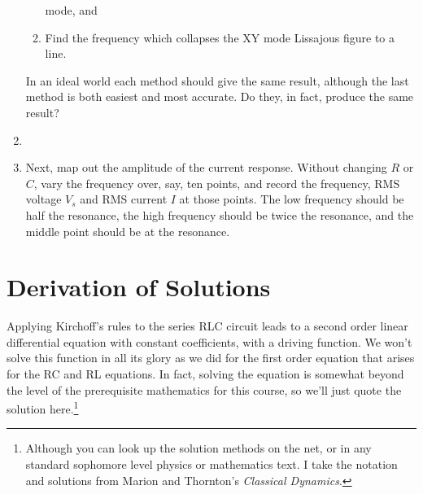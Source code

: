 \documentclass[12pt]{article}
\begin{document}
\begin{enumerate}
\begin{enumerate}
    mode, and
  \item Find the frequency which collapses the XY mode Lissajous
    figure to a line.
  \end{enumerate}
  In an ideal world each method should give the same result, although
  the last method is both easiest and most accurate.  Do they, in
  fact, produce the same result?
\item \label{item:amplitude_resonance} 
\item \label{item:current_response} Next, map out the amplitude of the current
  response.  Without changing $R$ or $C$, vary the frequency over, say, ten
  points, and record the frequency, RMS voltage $V_s$ and RMS current
  $I$ at those points.  The low frequency should be half the
  resonance, the high frequency should be twice the resonance, and the
  middle point should be at the resonance.
\end{enumerate}

\appendix

\section{Derivation of Solutions}
\label{sec:solutions}

Applying Kirchoff's rules to the series RLC circuit leads to a second
order linear differential equation with constant coefficients, with a
driving function.  We won't solve this function in all its glory as we
did for the first order equation that arises for the RC and RL
equations.  In fact, solving the equation is somewhat beyond the level
of the prerequisite mathematics for this course, so we'll just quote
the solution here.\footnote{Although you can look up the solution
  methods on the net, or in any standard sophomore level physics or
  mathematics text.  I take the notation and solutions from Marion and
  Thornton's \textit{Classical Dynamics}.}
\end{document}

